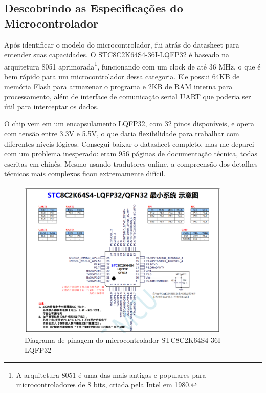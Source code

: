 \subsection{Descobrindo as Especificações do Microcontrolador}

Após identificar o modelo do microcontrolador, fui atrás do datasheet para entender suas capacidades. O STC8C2K64S4-36I-LQFP32 é baseado na arquitetura 8051 aprimorada\footnote{A arquitetura 8051 é uma das mais antigas e populares para microcontroladores de 8 bits, criada pela Intel em 1980.}, funcionando com um clock de até 36 MHz, o que é bem rápido para um microcontrolador dessa categoria. Ele possui 64KB de memória Flash para armazenar o programa e 2KB de RAM interna para processamento, além de interface de comunicação serial UART que poderia ser útil para interceptar os dados.

O chip vem em um encapsulamento LQFP32, com 32 pinos disponíveis, e opera com tensão entre 3.3V e 5.5V, o que daria flexibilidade para trabalhar com diferentes níveis lógicos. Consegui baixar o datasheet completo, mas me deparei com um problema inesperado: eram 956 páginas de documentação técnica, todas escritas em chinês. Mesmo usando tradutores online, a compreensão dos detalhes técnicos mais complexos ficou extremamente difícil.

\begin{figure}[htbp!]
\centering
\includegraphics[width=0.9\textwidth]{pre-textuais/figuras/pinagem_stc8c2k..png}
\caption{Diagrama de pinagem do microcontrolador STC8C2K64S4-36I-LQFP32}
\label{fig:pinagem_micro}
\end{figure}

